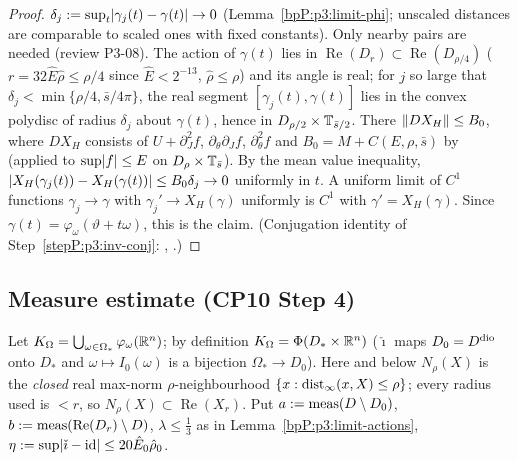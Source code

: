 \begin{proof}
$\delta_j:=\sup_t\lvert \gamma_j(t)-\gamma(t)\rvert\to0$ (Lemma~\ref{bpP:p3:limit-phi}; unscaled distances are comparable to scaled ones with fixed constants). Only nearby pairs are needed (review P3-08). The action of $\gamma(t)$ lies in $\operatorname{Re}(D_r)\subset\operatorname{Re}(D_{\rho/4})$ ($r=32\hat E\hat\rho\le\rho/4$ since $\hat E<2^{-13}$, $\hat\rho\le\rho$) and its angle is real; for $j$ so large that $\delta_j<\min\{\rho/4,\bar s/4\pi\}$, the real segment $[\gamma_j(t),\gamma(t)]$ lies in the convex polydisc of radius $\delta_j$ about $\gamma(t)$, hence in $D_{\rho/2}\times\mathbb{T}_{\bar s/2}$. There $\lVert DX_H\rVert\le B_0$, where $DX_H$ consists of $U+\partial_J^2f$, $\partial_\theta\partial_Jf$, $\partial_\theta^2f$ and $B_0=M+C(E,\rho,\bar s)$ by  (applied to $\sup\lvert f\rvert\le E$ on $D_\rho\times\mathbb{T}_{\bar s}$). By the mean value inequality, $\lvert X_H(\gamma_j(t))-X_H(\gamma(t))\rvert\le B_0\delta_j\to0$ uniformly in $t$. A uniform limit of $C^1$ functions $\gamma_j\to\gamma$ with $\gamma_j'\to X_H(\gamma)$ uniformly is $C^1$ with $\gamma'=X_H(\gamma)$. Since $\gamma(t)=\varphi_\omega(\vartheta+t\omega)$, this is the claim. (Conjugation identity of Step~\ref{stepP:p3:inv-conj}: , .)
\end{proof}

\subsection{Measure estimate (CP10 Step 4)}\label{bpP:p3:measure}

Let $K_\Omega=\bigcup_{\omega\in\Omega_*}\varphi_\omega(\mathbb{R}^n)$; by definition $K_\Omega=\Phi(D_*\times\mathbb{R}^n)$ ($\check\imath$ maps $D_0=D^{\rm dio}$ onto $D_*$ and $\omega\mapsto I_0(\omega)$ is a bijection $\Omega_*\to D_0$). Here and below $N_\rho(X)$ is the \emph{closed} real max-norm $\rho$-neighbourhood $\{x:\operatorname{dist}_\infty(x,X)\le\rho\}$; every radius used is $<r$, so $N_\rho(X)\subset\operatorname{Re}(X_r)$. Put $a:=\operatorname{meas}(D\setminus D_0)$, $b:=\operatorname{meas}(\operatorname{Re}(D_r)\setminus D)$, $\lambda\le\frac13$ as in Lemma~\ref{bpP:p3:limit-actions}, $\eta:=\sup\lvert \check\imath-\mathrm{id}\rvert\le20\hat E_0\hat\rho_0$.

